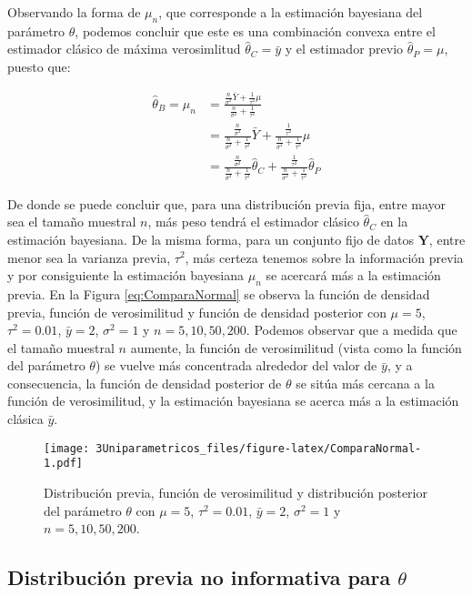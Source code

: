 \documentclass[
  10pt,
  spanish,
]{book}
\theoremstyle{definition}
\theoremstyle{definition}
\theoremstyle{definition}
\theoremstyle{definition}
\theoremstyle{remark}
\begin{document}
Observando la forma de \(\mu_n\), que corresponde a la estimación bayesiana del parámetro \(\theta\), podemos concluir que este es una combinación convexa entre el estimador clásico de máxima verosimlitud \(\hat{\theta}_C=\bar{y}\) y el estimador previo \(\hat{\theta}_P=\mu\), puesto que:

\begin{align*}
\hat{\theta}_B=\mu_n&=\frac{\frac{n}{\sigma^2}\bar{Y}+\frac{1}{\tau^2}\mu}{\frac{n}{\sigma^2}+\frac{1}{\tau^2}}\\
&=\frac{\frac{n}{\sigma^2}}{\frac{n}{\sigma^2}+\frac{1}{\tau^2}}\bar{Y}+\frac{\frac{1}{\tau^2}}{\frac{n}{\sigma^2}+\frac{1}{\tau^2}}\mu\\
&=\frac{\frac{n}{\sigma^2}}{\frac{n}{\sigma^2}+\frac{1}{\tau^2}}\hat{\theta}_C+\frac{\frac{1}{\tau^2}}{\frac{n}{\sigma^2}+\frac{1}{\tau^2}}\hat{\theta}_P
\end{align*}

De donde se puede concluir que, para una distribución previa fija, entre mayor sea el tamaño muestral \(n\), más peso tendrá el estimador clásico \(\hat{\theta}_C\) en la estimación bayesiana. De la misma forma, para un conjunto fijo de datos \(\mathbf{Y}\), entre menor sea la varianza previa, \(\tau^2\), más certeza tenemos sobre la información previa y por consiguiente la estimación bayesiana \(\mu_n\) se acercará más a la estimación previa. En la Figura \eqref{eq:ComparaNormal} se observa la función de densidad previa, función de verosimilitud y función de densidad posterior con \(\mu=5\), \(\tau^2=0.01\), \(\bar{y}=2\), \(\sigma^2=1\) y \(n=5,10,50,200\). Podemos observar que a medida que el tamaño muestral \(n\) aumente, la función de verosimilitud (vista como la función del parámetro \(\theta\)) se vuelve más concentrada alrededor del valor de \(\bar{y}\), y a consecuencia, la función de densidad posterior de \(\theta\) se sitúa más cercana a la función de verosimilitud, y la estimación bayesiana se acerca más a la estimación clásica \(\bar{y}\).

\begin{figure}
\centering
\texttt{[image: 3Uniparametricos\_files/figure-latex/ComparaNormal-1.pdf]}
\caption{\label{fig:ComparaNormal}Distribución previa, función de verosimilitud y distribución posterior del parámetro \(\theta\) con \(\mu=5\), \(\tau^2=0.01\), \(\bar{y}=2\), \(\sigma^2=1\) y \(n=5,10,50,200\).}
\end{figure}

\hypertarget{distribuciuxf3n-previa-no-informativa-para-theta}{%
\subsection{\texorpdfstring{Distribución previa no informativa para \(\theta\)}{Distribución previa no informativa para \textbackslash theta}}\label{distribuciuxf3n-previa-no-informativa-para-theta}}
\end{document}
